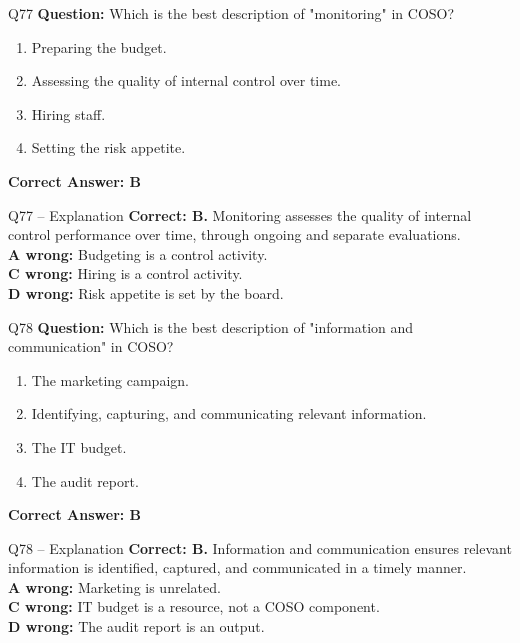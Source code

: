 \documentclass[aspectratio=169,10pt]{beamer}
\begin{document}
	\begin{frame}[t]{Q77}
		\small
		\textbf{Question:} Which is the best description of "monitoring" in COSO?
		\begin{enumerate}[label=\Alph*.,itemsep=1pt,topsep=2pt]
			\item Preparing the budget.
			\item Assessing the quality of internal control over time.
			\item Hiring staff.
			\item Setting the risk appetite.
		\end{enumerate}
		\vspace{4pt}
		\textbf{Correct Answer: B}
	\end{frame}
	
	\begin{frame}[t]{Q77 -- Explanation}
		\small
		\textbf{Correct: B.} Monitoring assesses the quality of internal control performance over time, through ongoing and separate evaluations. \\[4pt]
		\textbf{A wrong:} Budgeting is a control activity. \\[2pt]
		\textbf{C wrong:} Hiring is a control activity. \\[2pt]
		\textbf{D wrong:} Risk appetite is set by the board.
	\end{frame}
	
	\begin{frame}[t]{Q78}
		\small
		\textbf{Question:} Which is the best description of "information and communication" in COSO?
		\begin{enumerate}[label=\Alph*.,itemsep=1pt,topsep=2pt]
			\item The marketing campaign.
			\item Identifying, capturing, and communicating relevant information.
			\item The IT budget.
			\item The audit report.
		\end{enumerate}
		\vspace{4pt}
		\textbf{Correct Answer: B}
	\end{frame}
	
	\begin{frame}[t]{Q78 -- Explanation}
		\small
		\textbf{Correct: B.} Information and communication ensures relevant information is identified, captured, and communicated in a timely manner. \\[4pt]
		\textbf{A wrong:} Marketing is unrelated. \\[2pt]
		\textbf{C wrong:} IT budget is a resource, not a COSO component. \\[2pt]
		\textbf{D wrong:} The audit report is an output.
	\end{frame}
	
\end{document}
